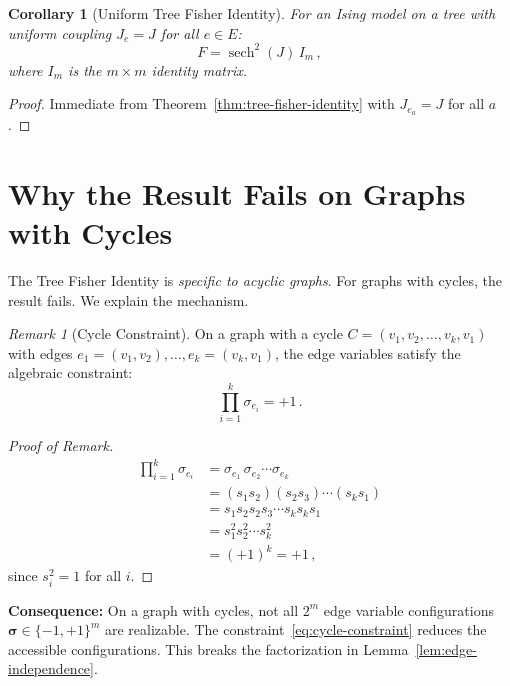\documentclass[11pt]{article}
\newtheorem{corollary}[theorem]{Corollary}
\theoremstyle{definition}
\theoremstyle{remark}
\newtheorem{remark}[theorem]{Remark}
\begin{document}
\begin{corollary}[Uniform Tree Fisher Identity]
\label{cor:uniform-tree-fisher}
For an Ising model on a tree with uniform coupling $J_e = J$ for all
$e \in E$:
\begin{equation}
\label{eq:uniform-tree-fisher}
F = \operatorname{sech}^2(J)\, I_m\,,
\end{equation}
where $I_m$ is the $m \times m$ identity matrix.
\end{corollary}

\begin{proof}
Immediate from Theorem~\ref{thm:tree-fisher-identity} with
$J_{e_a} = J$ for all $a$.
\end{proof}

\section{Why the Result Fails on Graphs with Cycles}

The Tree Fisher Identity is \emph{specific to acyclic graphs}. For graphs
with cycles, the result fails. We explain the mechanism.

\begin{remark}[Cycle Constraint]
\label{rem:cycle-constraint}
On a graph with a cycle $C = (v_1, v_2, \ldots, v_k, v_1)$ with edges
$e_1 = (v_1, v_2), \ldots, e_k = (v_{k}, v_1)$, the edge variables satisfy
the algebraic constraint:
\begin{equation}
\label{eq:cycle-constraint}
\prod_{i=1}^{k} \sigma_{e_i} = +1\,.
\end{equation}
\end{remark}

\begin{proof}[Proof of Remark]
\begin{align}
\prod_{i=1}^{k} \sigma_{e_i}
&= \sigma_{e_1}\, \sigma_{e_2} \cdots \sigma_{e_k} \nonumber\\
&= (s_1 s_2)(s_2 s_3) \cdots (s_k s_1) \nonumber\\
&= s_1 s_2 s_2 s_3 \cdots s_k s_k s_1 \nonumber\\
&= s_1^2 s_2^2 \cdots s_k^2 \nonumber\\
&= (+1)^k = +1\,,
\end{align}
since $s_i^2 = 1$ for all $i$.
\end{proof}

\textbf{Consequence:} On a graph with cycles, not all $2^m$ edge variable
configurations $\boldsymbol{\sigma} \in \{-1, +1\}^m$ are realizable. The
constraint~\eqref{eq:cycle-constraint} reduces the accessible configurations.
This breaks the factorization in Lemma~\ref{lem:edge-independence}.
\end{document}
